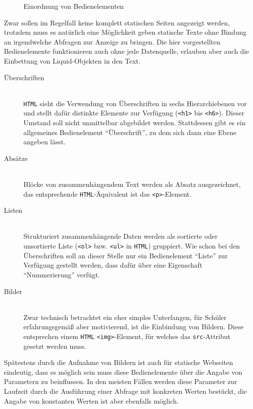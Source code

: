 \begin{figure}[p]
  \centering 
  \caption{Einordnung von Bedienelementen}
  \label{fig:ui-element-concept}
\end{figure}

Zwar sollen im Regelfall keine komplett statischen Seiten angezeigt werden, trotzdem muss es natürlich eine Möglichkeit geben statische Texte ohne Bindung an irgendwelche Abfragen zur Anzeige zu bringen. Die hier vorgestellten Bedienelemente funktionieren auch ohne jede Datenquelle, erlauben aber auch die Einbettung von Liquid-Objekten in den Text.

\begin{description}
\item[Überschriften] \hfill \\
  \texttt{HTML} sieht die Verwendung von Überschriften in sechs Hierarchiebenen vor und stellt dafür distinkte Elemente zur Verfügung (\texttt{<h1>} bis \texttt{<h6>}). Dieser Umstand soll nicht unmittelbar abgebildet werden. Stattdessen gibt es ein allgemeines Bedienelement ``Überschrift'', zu dem sich dann eine Ebene angeben lässt.
\item[Absätze] \hfill \\
  Blöcke von zusammenhängendem Text werden als Absatz ausgezeichnet, das entsprechende \texttt{HTML}-Äquivalent ist das \texttt{<p>}-Element.
\item[Listen] \hfill \\
  Strukturiert zusammenhängende Daten werden als sortierte oder unsortierte Liste (\texttt{<ol>} bzw. \texttt{<ul>} in \texttt{HTML}) gruppiert. Wie schon bei den Überschriften soll an dieser Stelle nur ein Bedienelement "`Liste"' zur Verfügung gestellt werden, dass dafür über eine Eigenschaft ``Nummerierung'' verfügt.
\item[Bilder] \hfill \\
  Zwar technisch betrachtet ein eher simples Unterfangen, für Schüler erfahrungsgemäß aber motivierend, ist die Einbindung von Bildern. Diese entsprechen einem \texttt{HTML} \texttt{<img>}-Element, für welches das \texttt{src}-Attribut gesetzt werden muss.
\end{description}

Spätestens durch die Aufnahme von Bildern ist auch für statische Webseiten eindeutig, dass es möglich sein muss diese Bedienelemente über die Angabe von Parametern zu beinflussen. In den meisten Fällen werden diese Parameter zur Laufzeit durch die Ausführung einer Abfrage mit konkreten Werten bestückt, die Angabe von konstanten Werten ist aber ebenfalls möglich.

